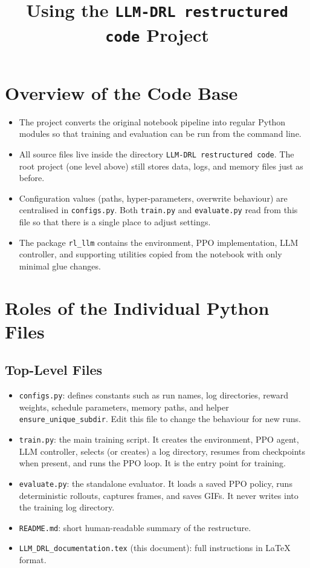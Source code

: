 \documentclass[12pt]{article}
\title{Using the \texttt{LLM-DRL restructured code} Project}
\author{}
\date{}
\begin{document}
\maketitle

\section{Overview of the Code Base}
\begin{itemize}[leftmargin=1.2cm]
  \item The project converts the original notebook pipeline into regular Python modules so that training and evaluation can be run from the command line.
  \item All source files live inside the directory \texttt{LLM-DRL restructured code}. The root project (one level above) still stores data, logs, and memory files just as before.
  \item Configuration values (paths, hyper-parameters, overwrite behaviour) are centralised in \texttt{configs.py}. Both \texttt{train.py} and \texttt{evaluate.py} read from this file so that there is a single place to adjust settings.
  \item The package \texttt{rl\_llm} contains the environment, PPO implementation, LLM controller, and supporting utilities copied from the notebook with only minimal glue changes.
\end{itemize}

\section{Roles of the Individual Python Files}
\subsection{Top-Level Files}
\begin{itemize}[leftmargin=1.2cm]
  \item \texttt{configs.py}: defines constants such as run names, log directories, reward weights, schedule parameters, memory paths, and helper \texttt{ensure\_unique\_subdir}. Edit this file to change the behaviour for new runs.
  \item \texttt{train.py}: the main training script. It creates the environment, PPO agent, LLM controller, selects (or creates) a log directory, resumes from checkpoints when present, and runs the PPO loop. It is the entry point for training.
  \item \texttt{evaluate.py}: the standalone evaluator. It loads a saved PPO policy, runs deterministic rollouts, captures frames, and saves GIFs. It never writes into the training log directory.
  \item \texttt{README.md}: short human-readable summary of the restructure.
  \item \texttt{LLM\_DRL\_documentation.tex} (this document): full instructions in \LaTeX{} format.
\end{itemize}
\end{document}
